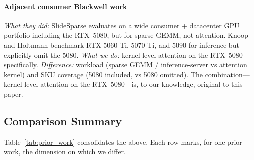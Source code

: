 \documentclass[conference]{IEEEtran}
\begin{document}
\paragraph*{Adjacent consumer Blackwell work~\cite{shao2026slidesparse,knoop2026consumerllm}}
\emph{What they did:} SlideSparse evaluates on a wide consumer +
datacenter GPU portfolio including the RTX~5080, but for sparse
GEMM, not attention. Knoop and Holtmann benchmark RTX 5060 Ti,
5070 Ti, and 5090 for inference but explicitly omit the 5080.
\emph{What we do:} kernel-level attention on the RTX~5080
specifically. \emph{Difference:} workload (sparse GEMM /
inference-server vs attention kernel) and SKU coverage (5080
included, vs 5080 omitted). The combination---kernel-level
attention on the RTX~5080---is, to our knowledge, original to
this paper.

\subsection{Comparison Summary}

Table~\ref{tab:prior_work} consolidates the above. Each row marks,
for one prior work, the dimension on which we differ.
\end{document}
